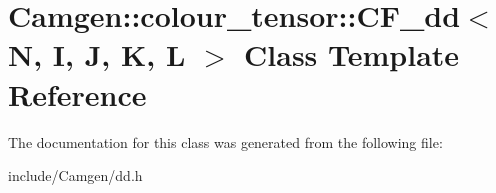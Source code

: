 \hypertarget{a00029}{}\section{Camgen\+:\+:colour\+\_\+tensor\+:\+:C\+F\+\_\+dd$<$ N, I, J, K, L $>$ Class Template Reference}
\label{a00029}


The documentation for this class was generated from the following file\+:\begin{DoxyCompactItemize}
\item 
include/\+Camgen/dd.\+h\end{DoxyCompactItemize}

